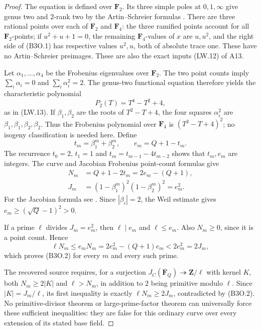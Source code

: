 \documentclass[11pt,a4paper]{article}
\begin{document}
\begin{proof}
The equation is defined over $\mathbf F_2$.  Its three simple
poles at $0,1,\infty$ give genus two and $2$-rank two by the
Artin--Schreier formulas \cite[Lemma~2.6]{PriesZhu2012}.
There are three rational points over each of $\mathbf F_2$
and $\mathbf F_4$: the three ramified points account for all
$\mathbf F_2$-points; if $u^2+u+1=0$, the remaining
$\mathbf F_4$-values of $x$ are $u,u^2$, and the right side
of (B3O.1) has respective values $u^2,u$, both of absolute
trace one.  These have no Artin--Schreier preimages.
These are also the exact inputs (LW.12) of A13.

Let $\alpha_1,\ldots,\alpha_4$ be the Frobenius eigenvalues
over $\mathbf F_2$.  The two point counts imply
$\sum_i\alpha_i=0$ and $\sum_i\alpha_i^2=2$.
The genus-two functional equation therefore yields the
characteristic polynomial
\[
                         P_2(T)=T^4-T^2+4,
 \tag{B3O.3}
\]
as in (LW.13).  If $\beta_1,\beta_2$ are the roots of
$T^2-T+4$, the four squares $\alpha_i^2$ are
$\beta_1,\beta_1,\beta_2,\beta_2$.
Thus the Frobenius polynomial over $\mathbf F_4$ is
$(T^2-T+4)^2$; no isogeny classification is needed here.
Define
\[
 t_m=\beta_1^m+\beta_2^m,\qquad e_m=Q+1-t_m.
 \tag{B3O.4}
\]
The recurrence $t_0=2$, $t_1=1$ and
$t_m=t_{m-1}-4t_{m-2}$ shows that $t_m,e_m$ are integers.
The curve and Jacobian Frobenius point-count formulas give
\[
 \begin{aligned}
 N_m&=Q+1-2t_m=2e_m-(Q+1),\\
 J_m&=(1-\beta_1^m)^2(1-\beta_2^m)^2=e_m^2.
 \end{aligned}
 \tag{B3O.5}
\]
For the Jacobian formula see
\cite[Theorem~19.1(b)]{MilneAV}.
Since $|\beta_i|=2$, the Weil estimate gives
$e_m\ge(\sqrt Q-1)^2>0$.

If a prime $\ell$ divides $J_m=e_m^2$, then
$\ell\mid e_m$ and $\ell\le e_m$.
Also $N_m\ge0$, since it is a point count.  Hence
\[
 \ell N_m\le e_mN_m
       =2e_m^2-(Q+1)e_m
       <2e_m^2=2J_m,
 \tag{B3O.6}
\]
which proves (B3O.2) for every $m$ and every such prime.

The recovered source \cite[B.3, formula~(B.CL.2)]{A1run}
requires, for a surjection
$J_C(\mathbf F_Q)\twoheadrightarrow\mathbf Z/\ell$
with kernel $K$, both $N_m\ge2|K|$ and $\ell>N_m$,
in addition to $2$ being primitive modulo $\ell$.
Since $|K|=J_m/\ell$, its first inequality is exactly
$\ell N_m\ge2J_m$, contradicted by (B3O.2).
No primitive-divisor theorem or large-prime-factor theorem
can universally force these sufficient inequalities:
they are false for this ordinary curve over every extension
of its stated base field.


\end{proof}
\end{document}
